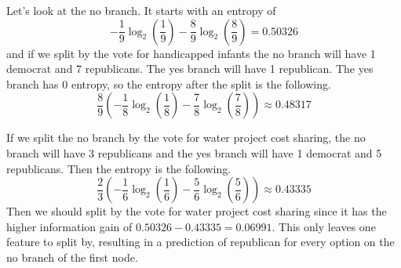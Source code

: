 \documentclass[12pt]{article}
\begin{document}
Let's look at the no branch. It starts with an entropy of
\[-\frac{1}{9}\log_2\left(\frac{1}{9}\right)-\frac{8}{9}\log_2\left(\frac{8}{9}\right)=0.50326\]
and if we split by the vote for handicapped infants the no branch will have 1 democrat and 7 republicans. The yes
branch will have 1 republican. The yes branch has 0 entropy, so the entropy after the split is the following.
\[\frac{8}{9}\left(-\frac{1}{8}\log_2\left(\frac{1}{8}\right)-\frac{7}{8}\log_2\left(\frac{7}{8}\right)\right)\approx 0.48317\]

If we split the no branch by the vote for water project cost sharing, the no branch will have 3 republicans and the yes branch
will have 1 democrat and 5 republicans. Then the entropy is the following.
\[\frac{2}{3}\left(-\frac{1}{6}\log_2\left(\frac{1}{6}\right)-\frac{5}{6}\log_2\left(\frac{5}{6}\right)\right)\approx 0.43335\]
Then we should split by the vote for water project cost sharing since it has the higher information gain of \(0.50326-0.43335=0.06991\).
This only leaves one feature to split by, resulting in a prediction of republican for every option on the no branch of the first node.
\end{document}
